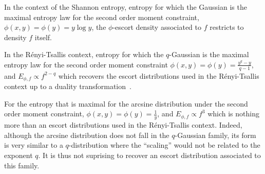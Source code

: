 \documentclass[entropy,article,submit,moreauthors,pdftex]{Definitions/mdpi}
\newcounter{GaussExample}%
\newcounter{qGaussExample}%
\newcounter{arcsineExample}%
\begin{document}
\renewcommand{\theexample}{\arabic{example}}
\begin{Example}
  In the context of  the Shannon entropy, entropy for which  the Gaussian is the
  maximal  entropy law  for the  second  order moment  constraint, $\phi(x,y)  =
  \phi(y) = y \log y$, the  $\phi$-escort density associated to $f$ restricts to
  density $f$ itself.
\end{Example}
%
\begin{Example}
  In  the R\'enyi-Tsallis  context, entropy  for which  the $q$-Gaussian  is the
  maximal  entropy law  for  the  second order  moment  constraint $\phi(x,y)  =
  \phi(y) = \frac{y^q-y}{q-1}$, and  $E_{\phi,f} \propto f^{2-q}$ which recovers
  the escort distributions  used in the R\'enyi-Tsallis context up  to a duality
  transformation~\cite{Nau11}.
\end{Example}
%
\begin{Example}
  For the entropy that is maximal  for the arcsine distribution under the second
  order moment constraint, $\phi(x,y) =  \phi(y) = \frac{1}{y}$, and $E_{\phi,f}
  \propto f^3$  which is nothing more  than an escort distributions  used in the
  R\'enyi-Tsallis context.   Indeed, although the arcsine  distribution does not
  fall  in   the  $q$-Gaussian   family,  its   form  is   very  similar   to  a
  $q$-distribution where  the ``scaling'' would  not be related to  the exponent
  $q$.  It is thus not suprising to recover an escort distribution associated to
  this family.
\end{Example}
\end{document}

